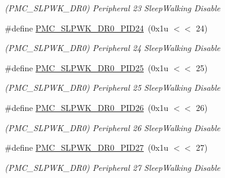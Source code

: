 \begin{DoxyCompactItemize}
\begin{DoxyCompactList}\small\item\em (P\+M\+C\+\_\+\+S\+L\+P\+W\+K\+\_\+\+D\+R0) Peripheral 23 Sleep\+Walking Disable \end{DoxyCompactList}\item 
\mbox{\label{group__SAME70__PMC_ga329e5bf2ae42407a3abce01e22b8f7ab}} 
\#define \mbox{\hyperlink{group__SAME70__PMC_ga329e5bf2ae42407a3abce01e22b8f7ab}{P\+M\+C\+\_\+\+S\+L\+P\+W\+K\+\_\+\+D\+R0\+\_\+\+P\+I\+D24}}~(0x1u $<$$<$ 24)
\begin{DoxyCompactList}\small\item\em (P\+M\+C\+\_\+\+S\+L\+P\+W\+K\+\_\+\+D\+R0) Peripheral 24 Sleep\+Walking Disable \end{DoxyCompactList}\item 
\mbox{\label{group__SAME70__PMC_ga7f86af4e4352b0feb90001d327f003f4}} 
\#define \mbox{\hyperlink{group__SAME70__PMC_ga7f86af4e4352b0feb90001d327f003f4}{P\+M\+C\+\_\+\+S\+L\+P\+W\+K\+\_\+\+D\+R0\+\_\+\+P\+I\+D25}}~(0x1u $<$$<$ 25)
\begin{DoxyCompactList}\small\item\em (P\+M\+C\+\_\+\+S\+L\+P\+W\+K\+\_\+\+D\+R0) Peripheral 25 Sleep\+Walking Disable \end{DoxyCompactList}\item 
\mbox{\label{group__SAME70__PMC_gac30ab55e859fff38f4d947cbbe2ede8a}} 
\#define \mbox{\hyperlink{group__SAME70__PMC_gac30ab55e859fff38f4d947cbbe2ede8a}{P\+M\+C\+\_\+\+S\+L\+P\+W\+K\+\_\+\+D\+R0\+\_\+\+P\+I\+D26}}~(0x1u $<$$<$ 26)
\begin{DoxyCompactList}\small\item\em (P\+M\+C\+\_\+\+S\+L\+P\+W\+K\+\_\+\+D\+R0) Peripheral 26 Sleep\+Walking Disable \end{DoxyCompactList}\item 
\mbox{\label{group__SAME70__PMC_gac05c9ac4acc0d89d111dad66b29678ad}} 
\#define \mbox{\hyperlink{group__SAME70__PMC_gac05c9ac4acc0d89d111dad66b29678ad}{P\+M\+C\+\_\+\+S\+L\+P\+W\+K\+\_\+\+D\+R0\+\_\+\+P\+I\+D27}}~(0x1u $<$$<$ 27)
\begin{DoxyCompactList}\small\item\em (P\+M\+C\+\_\+\+S\+L\+P\+W\+K\+\_\+\+D\+R0) Peripheral 27 Sleep\+Walking Disable \end{DoxyCompactList}\item 

\end{DoxyCompactItemize}
